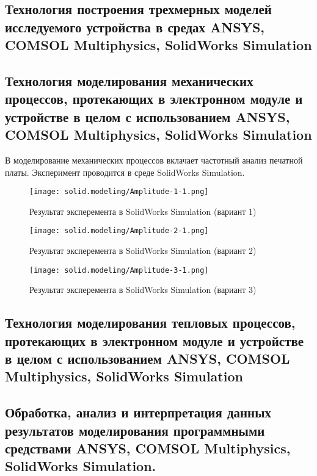 \subsection{Технология построения трехмерных моделей исследуемого
  устройства в средах ANSYS, COMSOL Multiphysics, SolidWorks Simulation}

\subsection{Технология моделирования механических процессов,
протекающих в электронном модуле и устройстве в целом с
использованием ANSYS, COMSOL Multiphysics, SolidWorks Simulation}

В моделирование механических процессов вклачает частотный анализ
печатной платы. Эксперимент проводится в среде SolidWorks Simulation.

\begin{figure}[H]
  \centering
  \texttt{[image: solid.modeling/Amplitude-1-1.png]}
  \caption{Результат эксперемента в SolidWorks Simulation (вариант 1)}
\end{figure}

\begin{figure}[H]
  \centering
  \texttt{[image: solid.modeling/Amplitude-2-1.png]}
  \caption{Результат эксперемента в SolidWorks Simulation (вариант 2)}
\end{figure}

\begin{figure}[H]
  \centering
  \texttt{[image: solid.modeling/Amplitude-3-1.png]}
  \caption{Результат эксперемента в SolidWorks Simulation (вариант 3)}
\end{figure}
\subsection{Технология моделирования тепловых процессов,
протекающих в электронном модуле и устройстве в целом с
использованием ANSYS, COMSOL Multiphysics, SolidWorks Simulation}


\subsection{Обработка, анализ и интерпретация данных результатов
моделирования программными средствами ANSYS, COMSOL Multiphysics,
SolidWorks Simulation.}




\newpage

